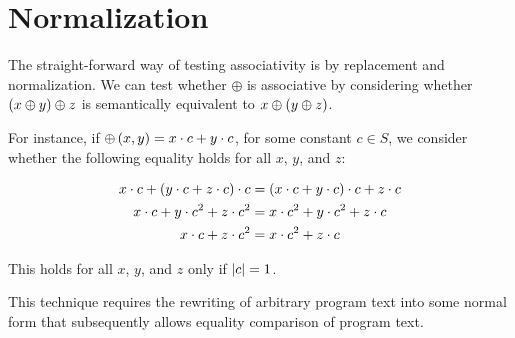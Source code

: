 \section{Normalization}

The straight-forward way of testing associativity is by replacement and
normalization. We can test whether $\oplus$ is associative by considering
whether $\left({x \oplus y}\right) \oplus z$ is semantically equivalent to $x \oplus \left({y
\oplus z}\right)$.

For instance, if $\oplus\left({x,y}\right) = x\cdot c + y \cdot c$, for some constant
$c\in S$, we consider whether the following equality holds for all $x$, $y$,
and $z$:

\begin{align*}
x\cdot c + \left({y\cdot c + z\cdot c}\right)\cdot c &= \left({x\cdot c + y\cdot c}\right)\cdot c + z\cdot c \\
x\cdot c + y\cdot c^2 + z\cdot c^2 &= x\cdot c^2 + y\cdot c^2 + z\cdot c \\
x\cdot c + z\cdot c^2 &= x\cdot c^2 + z\cdot c
\end{align*}

This holds for all $x$, $y$, and $z$ only if $\left|{c}\right|=1$.

This technique requires the rewriting of arbitrary program text into some
normal form that subsequently allows equality comparison of program text.
